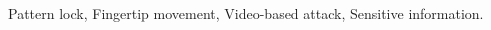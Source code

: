 \documentclass[journal,table,twoside]{IEEEtran}
\begin{document}
\maketitle



\begin{IEEEkeywords}
    Pattern lock, Fingertip movement, Video-based attack, Sensitive information.
\end{IEEEkeywords}












\IEEEpeerreviewmaketitle


\ifCLASSOPTIONcaptionsoff
  \newpage
\fi

\begin{spacing}{0.98}

\balance
\vspace{-3mm}

\end{spacing}
\end{document}
